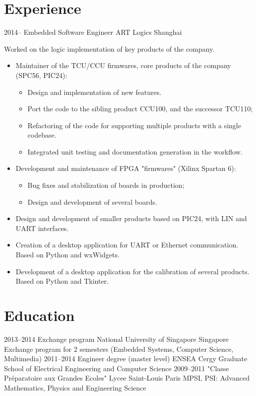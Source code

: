 \documentclass[11pt,a4paper,sans]{moderncv}        %
\begin{document}
\section{Experience}
\cventry
  {2014--\the\year}
  {Embedded Software Engineer}
  {ART Logics}
  {Shanghai}
  {}
  {
    Worked on the logic implementation of key products of the company.
    \begin{itemize}%
    \item Maintainer of the TCU/CCU firmwares, core products of the company (SPC56, PIC24):
      \begin{itemize}%
      \item Design and implementation of new features.
      \item Port the code to the sibling product CCU100, and the successor TCU110;
      \item Refactoring of the code for supporting multiple products with a single codebase.
      \item Integrated unit testing and documentation generation in the workflow.
      \end{itemize}
    \item Development and maintenance of FPGA "firmwares" (Xilinx Spartan 6):
      \begin{itemize}%
      \item Bug fixes and stabilization of boards in production;
      \item Design and development of several boards.
      \end{itemize}
    \item Design and development of smaller products based on PIC24, with LIN and UART interfaces.
    \item Creation of a desktop application for UART or Ethernet communication. Based on Python and wxWidgets.
    \item Development of a desktop application for the calibration of several products. Based on Python and Tkinter.
    \end{itemize}
  }

\section{Education}
\cventry
  {2013--2014}
  {Exchange program}
  {National University of Singapore}
  {Singapore}
  {}
  {Exchange program for 2 semesters (Embedded Systems, Computer Science, Multimedia)}  %
\cventry
  {2011--2014}
  {Engineer degree (master level)}
  {ENSEA}
  {Cergy}
  {}
  {Graduate School of Electrical Engineering and Computer Science}
\cventry
  {2009--2011}
  {"Classe Préparatoire aux Grandes Ecoles"}
  {Lycee Saint-Louis}
  {Paris}
  {}
  {MPSI, PSI: Advanced Mathematics, Physics and Engineering Science}
\end{document}
